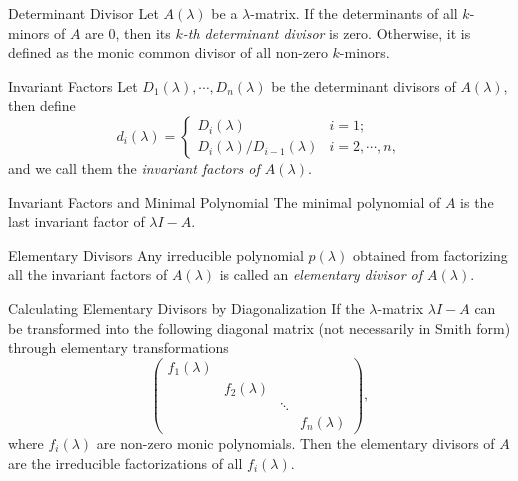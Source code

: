 \begin{definition}{Determinant Divisor}{}
  Let $A(\lambda)$ be a $\lambda$-matrix. If the determinants of all $k$-minors
  of $A$ are $0$, then its \emph{$k$-th determinant divisor} is zero.
  Otherwise, it is defined as the monic common divisor of all non-zero $k$-minors.
\end{definition}

\begin{definition}{Invariant Factors}{}
  Let $D_1(\lambda), \cdots, D_n(\lambda)$ be the determinant divisors of
  $A(\lambda)$,
  then define
  \begin{equation}
    d_i(\lambda) =
    \begin{cases}
      D_i(\lambda) & i = 1;\\
      D_i(\lambda)/D_{i-1}(\lambda) & i = 2,\cdots,n,
    \end{cases}
  \end{equation}
  and we call them the \emph{invariant factors of $A(\lambda)$}.
\end{definition}

\begin{proposition}{Invariant Factors and Minimal Polynomial}{}
  The minimal polynomial of $A$ is the last invariant factor of $\lambda I - A$.
\end{proposition}

\begin{definition}{Elementary Divisors}{}
  Any irreducible polynomial $p(\lambda)$
  obtained from factorizing all the invariant factors of $A(\lambda)$ is called
  an \emph{elementary divisor of $A(\lambda)$}.
\end{definition}

\begin{proposition}{Calculating Elementary Divisors by Diagonalization}{}
  If the $\lambda$-matrix $\lambda I - A$ can be transformed into
  the following diagonal matrix (not necessarily in Smith form) through elementary transformations
  \begin{equation}
    \begin{pmatrix}
      f_1(\lambda) & & &\\
                   &f_2(\lambda) & &\\
                   & &\ddots &\\
                   & & &f_n(\lambda)
    \end{pmatrix},
  \end{equation}
  where $f_i(\lambda)$ are non-zero monic polynomials.
  Then the elementary divisors of $A$ are the irreducible factorizations of all $f_i(\lambda)$.
\end{proposition}

